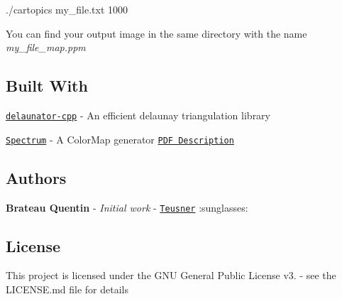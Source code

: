 \begin{DoxyCode}
./cartopics my\_file.txt 1000
\end{DoxyCode}


You can find your output image in the same directory with the name {\itshape my\+\_\+file\+\_\+map.\+ppm}

\subsection*{Built With}


\begin{DoxyItemize}
\item \href{https://github.com/delfrrr/delaunator-cpp}{\tt delaunator-\/cpp} -\/ An efficient delaunay triangulation library
\item \href{https://github.com/richardroberts1992/Spectrum}{\tt Spectrum} -\/ A Color\+Map generator \href{http://cs.swan.ac.uk/~csbob/research/callCenter/color/roberts18spectrum.pdf}{\tt P\+DF Description}
\end{DoxyItemize}

\subsection*{Authors}


\begin{DoxyItemize}
\item {\bfseries Brateau Quentin} -\/ {\itshape Initial work} -\/ \href{https://github.com/Teusner}{\tt Teusner} \+:sunglasses\+:
\end{DoxyItemize}

\subsection*{License}

This project is licensed under the G\+NU General Public License v3. -\/ see the L\+I\+C\+E\+N\+SE.md file for details 
